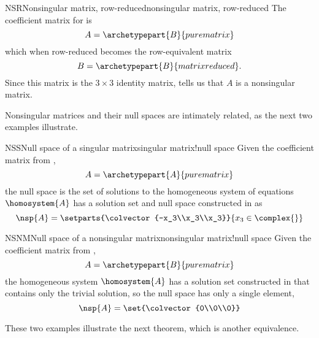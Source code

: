 %
\begin{example}{NSR}{Nonsingular matrix, row-reduced}{nonsingular matrix, row-reduced}
The coefficient matrix for  is
%
\begin{equation*}
A=\archetypepart{B}{purematrix}
\end{equation*}
%
which when row-reduced becomes the row-equivalent matrix
%
\begin{equation*}
B=\archetypepart{B}{matrixreduced}.
\end{equation*}
%
Since this matrix is the $3\times 3$ identity matrix,  tells us that $A$ is a nonsingular matrix.
\end{example}
%
%
Nonsingular matrices and their null spaces are intimately related, as the next two examples illustrate.
%
\begin{example}{NSS}{Null space of a singular matrix}{singular matrix!null space}
Given the coefficient matrix from ,
\begin{equation*}
A=\archetypepart{A}{purematrix}
\end{equation*}
the null space is the set of solutions to the homogeneous system of equations  $\homosystem{A}$ has a solution set and null space constructed in  as
\begin{equation*}
\nsp{A}=\setparts{\colvector{-x_3\\x_3\\x_3}}{x_3\in\complex{\null}}
\end{equation*}
\end{example}
%
\begin{example}{NSNM}{Null space of a nonsingular matrix}{nonsingular matrix!null space}
Given the coefficient matrix from ,
\begin{equation*}
A=\archetypepart{B}{purematrix}
\end{equation*}
the homogeneous system $\homosystem{A}$ has a solution set constructed in  that contains only the trivial solution, so the null space has only a single element,
\begin{equation*}
\nsp{A}=\set{\colvector{0\\0\\0}}
\end{equation*}
\end{example}
%
These two examples illustrate the next theorem, which is another equivalence.
